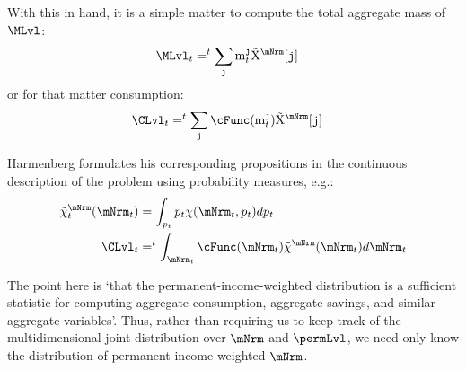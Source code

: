 \documentclass[\econtexRoot/BufferStockTheory]{subfiles}
\begin{document}
With this in hand, it is a simple matter to compute the total aggregate mass of $\MLvl$:
\begin{equation}\begin{gathered}\begin{aligned}
  \MLvl_{t} & = \PermGroFac^{t} \sum_{\nmNrmVecNow} \mNrmVecNow \mpMatMargWgt[\nmNrmVecNow]
\end{aligned}\end{gathered}\end{equation}
or for that matter consumption:
\begin{equation}\begin{gathered}\begin{aligned}
  \CLvl_{t} & = \PermGroFac^{t} \sum_{\nmNrmVecNow} \cFunc(\mNrmVecNow) \mpMatMargWgt[\nmNrmVecNow]
\end{aligned}\end{gathered}\end{equation}

Harmenberg formulates his corresponding propositions in the continuous description of the problem using probability measures, e.g.:
\begin{equation}\begin{gathered}\begin{aligned}
  \mpPrbMargWgt_{t}(\mNrmNow) & = \int_{\permLvlNow} \permLvlNow \mpPrb(\mNrmNow,\permLvlNow) d \permLvlNow
\\ \CLvl_{t} & = \PermGroFac^{t} \int_{\mNrmNow} \cFunc(\mNrmNow) \mpPrbMargWgt(\mNrmNow)                             d \mNrmNow
\end{aligned}\end{gathered}\end{equation}

The point here is `that the permanent-income-weighted distribution is a sufficient statistic for computing aggregate consumption, aggregate savings, and similar aggregate variables'.
Thus, rather than requiring us to keep track of the multidimensional joint distribution over $\mNrm$ and $\permLvl$, we need only know the distribution of permanent-income-weighted $\mNrm$.
\end{document}
